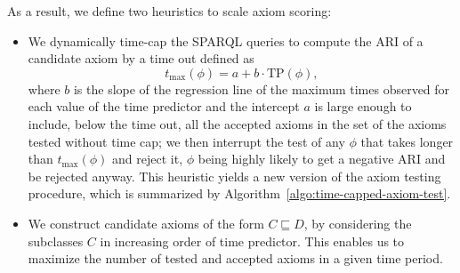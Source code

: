 \documentclass{sig-alternate}
\begin{document}
As a result, we define two heuristics to scale axiom scoring:
\begin{itemize}

\item We dynamically time-cap the SPARQL queries to compute the ARI of a candidate axiom
by a time out defined as
\begin{equation}\label{eq:time-cap}
  t_{\max}(\phi) = a + b\cdot\mathrm{TP}(\phi),
\end{equation}
where $b$ is the slope of the regression line of the maximum times observed
for each value of the time predictor and the intercept $a$ is large enough to include,
below the time out, all the accepted axioms in the set of the axioms tested without time cap;
we then interrupt the test of any $\phi$ that takes longer than $t_{\max}(\phi)$
and reject it, $\phi$ being highly likely to get a negative ARI and be rejected anyway.
This heuristic yields a new version of the axiom testing procedure, which is
summarized by Algorithm~\ref{algo:time-capped-axiom-test}.

\item We construct candidate axioms of the form $C \sqsubseteq D$, by considering
the subclasses $C$ in increasing order of time predictor.
This enables us to maximize the number of tested and accepted axioms in a given time period.

\end{itemize}
\end{document}
